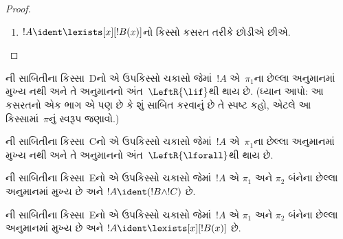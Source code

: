 \begin{proof}
\begin{enumerate}
સાબિતી~$\pi_1'$નો અંતિમ સિક્વન્ટ
$\Gamma \Sequent \Delta, !B(c)$ છે,
જ્યાં~$c$ એ~$\RightR{\lforall}$
અનુમાનનો સ્વચલ છે.
તેથી~$c$ એ~$!B(x)$, $\Gamma$
કે~$\Delta$માં આવતો નથી.
સાબિતી~$\pi$ નિયમિત છે એમ ધારીએ,
એટલે~$c$ માત્ર ત્યાર પછી આવતા
$\RightR{\lforall}$ અનુમાનનો જ સ્વચલ છે
અને તેની ઉપર જ આવે છે;
અર્થાત્, તે માત્ર~$\pi_1'$માં આવે છે
અને~$\pi_1'$ની અંદરના કોઈ અનુમાનનો
સ્વચલ નથી. કારણ કે~$c$ એ~$\pi_2$માં
આવતો નથી, તે~$t$માં પણ આવતો નથી.
 મુજબ
સાબિતી~$\Subst{\pi_1'}{t}{c}$ એ
$\Gamma \Sequent \Delta, !B(t)$ની
સાબિતી છે. હવે નીચેની
સાબિતી પર આગમન-પૂર્વધારણા લગાવીએ:
\[
\AxiomC{}
\RightLabel{$\Subst{\pi_1'}{t}{c}$}
\Deduce$\Gamma \fCenter \Delta, !B(t)$
\AxiomC{}
\RightLabel{$\pi_2''$}
\Deduce$!B(t), \Gamma \fCenter \Delta$
\RightLabel{\CutCS}
\BinaryInf$\Gamma \fCenter \Delta$
\DisplayProof
\]
(આગમન-પૂર્વધારણા લાગુ પડે છે,
કારણ કે કટ સૂત્ર~$!B(t)$ છે;
એટલે આ સાબિતીનો કટ-ક્રમ~$\pi$
કરતાં ઓછો છે.)
\item $!A \ident \lexists[x][!B(x)]$નો
કિસ્સો કસરત તરીકે છોડીએ છીએ.
\end{enumerate}
\end{proof}

\begin{prob}
ની સાબિતીના કિસ્સા~Dનો
એ ઉપકિસ્સો ચકાસો જેમાં~$!A$ એ~$\pi_1$ના
છેલ્લા અનુમાનમાં મુખ્ય નથી અને તે અનુમાનનો
અંત~$\LeftR{\lif}$થી થાય છે.
(ધ્યાન આપો: આ કસરતનો એક ભાગ એ પણ છે કે
શું સાબિત કરવાનું છે તે સ્પષ્ટ કહો,
એટલે આ કિસ્સામાં~$\pi$નું સ્વરૂપ જણાવો.)
\end{prob}

\begin{prob}
ની સાબિતીના કિસ્સા~Cનો
એ ઉપકિસ્સો ચકાસો જેમાં~$!A$ એ~$\pi_1$ના
છેલ્લા અનુમાનમાં મુખ્ય નથી અને તે અનુમાનનો
અંત~$\LeftR{\lforall}$થી થાય છે.
\end{prob}

\begin{prob}
ની સાબિતીના કિસ્સા~Eનો
એ ઉપકિસ્સો ચકાસો જેમાં~$!A$ એ
$\pi_1$ અને $\pi_2$ બંનેના
છેલ્લા અનુમાનમાં મુખ્ય છે અને
$!A \ident (!B \land !C)$ છે.
\end{prob}

\begin{prob}
ની સાબિતીના કિસ્સા~Eનો
એ ઉપકિસ્સો ચકાસો જેમાં~$!A$ એ
$\pi_1$ અને $\pi_2$ બંનેના
છેલ્લા અનુમાનમાં મુખ્ય છે અને
$!A \ident \lexists[x][!B(x)]$ છે.
\end{prob}

